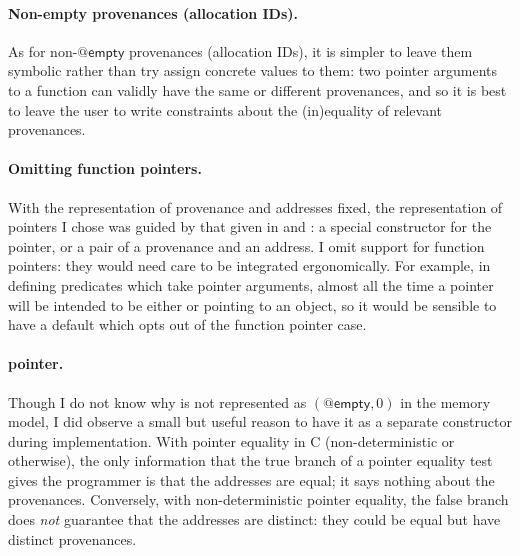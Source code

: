 \paragraph{Non-empty provenances (allocation IDs).}%
As for non-$@\mathsf{empty}$ provenances (allocation IDs), it is simpler to
leave them symbolic rather than try assign concrete values to them: two pointer
arguments to a function can validly have the same or different provenances, and
so it is best to leave the user to write constraints about the (in)equality of %
relevant provenances.

\paragraph{Omitting function pointers.}%
With the representation of provenance and addresses fixed, the representation
of pointers I chose was guided by that given in  and :
a special constructor for the  pointer, or a pair of a
provenance and an address. I omit support for function pointers:
they would need care to be integrated ergonomically. For example, in defining
predicates which take pointer arguments, almost all the time a pointer will be
intended to be either  or pointing to an object, so it would be sensible to
have a default which opts out of the function pointer case.

\paragraph{ pointer.}%
Though I do not know why  is not represented as
$(@\mathsf{empty}, 0)$ in the memory model, I did observe a
small but useful reason to have it as a separate constructor during
implementation. With pointer equality in C (non-deterministic or otherwise),
the only information that the true branch of a pointer equality test gives the
programmer is that the addresses are equal; it says nothing about the
provenances. Conversely, with non-deterministic pointer equality, the false
branch does \emph{not} guarantee that the addresses are distinct: they could be
equal but have distinct provenances.

